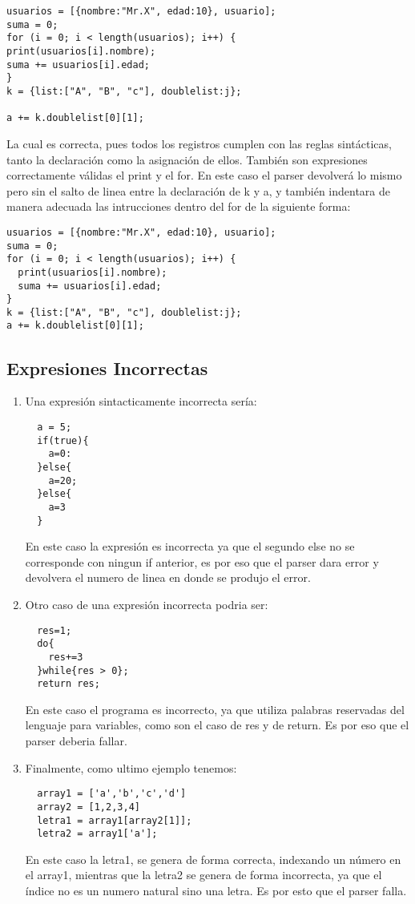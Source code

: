 \begin{enumerate}
\begin{verbatim}
usuarios = [{nombre:"Mr.X", edad:10}, usuario];
suma = 0;
for (i = 0; i < length(usuarios); i++) {
print(usuarios[i].nombre);
suma += usuarios[i].edad;
}
k = {list:["A", "B", "c"], doublelist:j};

a += k.doublelist[0][1];
\end{verbatim}
La cual es correcta, pues todos los registros cumplen con las
reglas sintácticas, tanto la declaración como la asignación de ellos. También
son expresiones correctamente válidas el print y el for. En este caso el parser
devolverá lo mismo pero sin el salto de linea entre la declaración de k y a, y
también indentara de manera adecuada las intrucciones dentro del for de la
siguiente forma:

\begin{verbatim}
usuarios = [{nombre:"Mr.X", edad:10}, usuario];
suma = 0;
for (i = 0; i < length(usuarios); i++) {
  print(usuarios[i].nombre);
  suma += usuarios[i].edad;
}
k = {list:["A", "B", "c"], doublelist:j};
a += k.doublelist[0][1];
\end{verbatim}

\end{enumerate}

\subsection{Expresiones Incorrectas}

\begin{enumerate}
\item Una expresión sintacticamente incorrecta sería:
  \begin{verbatim}
  a = 5;
  if(true){
    a=0:
  }else{
    a=20;
  }else{
    a=3
  }
  \end{verbatim}
  En este caso la expresión es incorrecta ya que el segundo else no se
  corresponde con ningun if anterior, es por eso que el parser dara error y
  devolvera el numero de linea en donde se produjo el error.

\item Otro caso de una expresión incorrecta podria ser:
  \begin{verbatim}
  res=1;
  do{
    res+=3
  }while{res > 0};
  return res;
  \end{verbatim}
  En este caso el programa es incorrecto, ya que utiliza palabras reservadas
  del lenguaje para variables, como son el caso de res y de return. Es por eso
  que el parser deberia fallar.
\item Finalmente, como ultimo ejemplo tenemos:
  \begin{verbatim}
  array1 = ['a','b','c','d']
  array2 = [1,2,3,4]
  letra1 = array1[array2[1]];
  letra2 = array1['a'];
  \end{verbatim}
  En este caso la letra1, se genera de forma correcta, indexando un número en
  el array1, mientras que la letra2 se genera de forma incorrecta, ya que el
  índice no es un numero natural sino una letra. Es por esto que el parser
  falla.
\end{enumerate}


